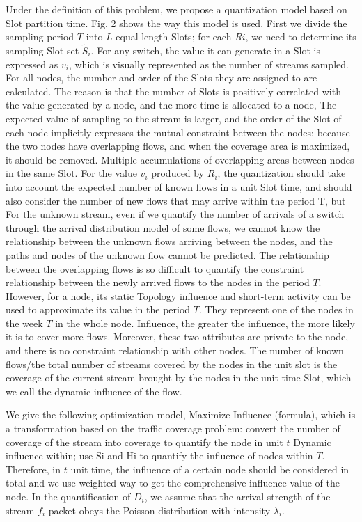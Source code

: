 \documentclass[conference,compsoc]{IEEEtran}
\begin{document}
Under the definition of this problem, we propose a quantization model based on Slot partition time. Fig. 2 shows the way this model is used. First we divide the sampling period $T$ into $L$ equal length Slots; for each $Ri$, we need to determine its sampling Slot set $\widetilde S_i$. For any switch, the value it can generate in a Slot is expressed as $v_i$, which is visually represented as the number of streams sampled. For all nodes, the number and order of the Slots they are assigned to are calculated. The reason is that the number of Slots is positively correlated with the value generated by a node, and the more time is allocated to a node, The expected value of sampling to the stream is larger, and the order of the Slot of each node implicitly expresses the mutual constraint between the nodes: because the two nodes have overlapping flows, and when the coverage area is maximized, it should be removed. Multiple accumulations of overlapping areas between nodes in the same Slot. For the value $v_i$ produced by $R_i$, the quantization should take into account the expected number of known flows in a unit Slot time, and should also consider the number of new flows that may arrive within the period T, but For the unknown stream, even if we quantify the number of arrivals of a switch through the arrival distribution model of some flows, we cannot know the relationship between the unknown flows arriving between the nodes, and the paths and nodes of the unknown flow cannot be predicted. The relationship between the overlapping flows is so difficult to quantify the constraint relationship between the newly arrived flows to the nodes in the period $T$. However, for a node, its static Topology influence and short-term activity can be used to approximate its value in the period $T$. They represent one of the nodes in the week $T$ in the whole node. Influence, the greater the influence, the more likely it is to cover more flows. Moreover, these two attributes are private to the node, and there is no constraint relationship with other nodes. The number of known flows/the total number of streams covered by the nodes in the unit slot is the coverage of the current stream brought by the nodes in the unit time Slot, which we call the dynamic influence of the flow.

We give the following optimization model, Maximize Influence (formula), which is a transformation based on the traffic coverage problem: convert the number of coverage of the stream into coverage to quantify the node in unit $t$ Dynamic influence within; use Si and Hi to quantify the influence of nodes within $T$. Therefore, in $t$ unit time, the influence of a certain node should be considered in total and we use weighted way to get the comprehensive influence value of the node.
In the quantification of $D_i$, we assume that the arrival strength of the stream $f_i$ packet obeys the Poisson distribution with intensity $\lambda_i$.
\end{document}
